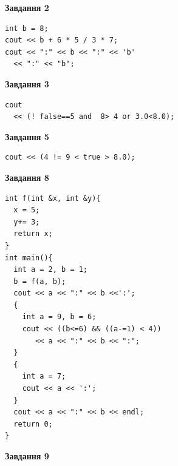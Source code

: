 \documentclass[12pt, ukrainian]{article}
\begin{document}
{\begin {large}
\begin{minipage}[t]{7.0cm}
\end{minipage}
\vline \hspace{1mm}
\begin{minipage}[t]{11.0cm}

\begin{center}
\textbf{Завдання 2}
\end{center}
\vspace{-8mm}

\begin{verbatim}
int b = 8;
cout << b + 6 * 5 / 3 * 7;
cout << ":" << b << ":" << 'b' 
  << ":" << "b";
\end{verbatim}



\begin{center}
\textbf{Завдання 3}
\end{center}
\vspace{-8mm}

\begin{verbatim}
cout 
  << (! false==5 and  8> 4 or 3.0<8.0);
\end{verbatim}



\begin{center}
\textbf{Завдання 5}
\end{center}
\vspace{-8mm}

\begin{verbatim}
cout << (4 != 9 < true > 8.0);
\end{verbatim}



\begin{center}
\textbf{Завдання 8}
\end{center}
\vspace{-8mm}

\begin{verbatim}
int f(int &x, int &y){
  x = 5;
  y+= 3;
  return x;
}
int main(){
  int a = 2, b = 1;
  b = f(a, b);
  cout << a << ":" << b <<':';
  {
    int a = 9, b = 6;
    cout << ((b<=6) && ((a-=1) < 4))
       << a << ":" << b << ":";
  }
  {
    int a = 7;
    cout << a << ':';
  }
  cout << a << ":" << b << endl;
  return 0;
}
\end{verbatim}

\end{minipage}


\begin{minipage}[t]{7.0cm}

\begin{center}
\textbf{Завдання 9}
\end{center}
\vspace{-8mm}


\end{minipage}
\end{large}}
\end{document}
